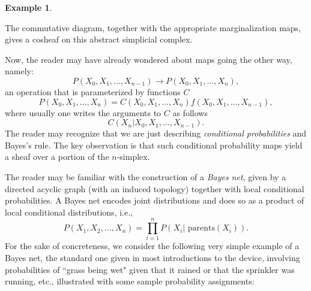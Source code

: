 \documentclass[11pt]{book}
\theoremstyle{definition}
\newtheorem{example}{Example}[section]
\theoremstyle{definition}
\theoremstyle{definition}
\theoremstyle{theorem}
\theoremstyle{definition}
\begin{document}
\begin{example}
\begin{center}
\end{center}
The commutative diagram, together with the appropriate marginalization maps, gives a cosheaf on this abstract simplicial complex.\par 
Now, the reader may have already wondered about maps going the other way, namely: 
\begin{equation}
P(X_0,X_1,\dots, X_{n-1}) \rightarrow P(X_0,X_1,\dots,X_n),
\end{equation}
an operation that is parameterized by functions $C$
\begin{equation}
P(X_0, X_1,\dots, X_n) = C(X_0,X_1,\dots,X_n) f(X_0,X_1,\dots,X_{n-1}),
\end{equation}
where usually one writes the arguments to $C$ as follows 
\begin{equation}
C(X_n \vert X_0, X_1, \dots, X_{n-1}).
\end{equation}
The reader may recognize that we are just describing \textit{conditional probabilities} and Bayes's rule. The key observation is that such conditional probability maps yield a sheaf over a portion of the $n$-simplex.\par 
The reader may be familiar with the construction of a \textit{Bayes net}, given by a directed acyclic graph (with an induced topology) together with local conditional probabilities. A Bayes net encodes joint distributions and does so as a product of local conditional distributions, i.e., 
\begin{equation}
P(X_1, X_2, \dots, X_n) = \prod_{i=1}^{n} P(X_i \lvert \text{ parents} (X_i) ).
\end{equation} 
For the sake of concreteness, we consider the following very simple example of a Bayes net, the standard one given in most introductions to the device, involving probabilities of ``grass being wet" given that it rained or that the sprinkler was running, etc., illustrated with some sample probability assignments: 
\begin{center} 

\end{center}
\end{example}
\end{document}
